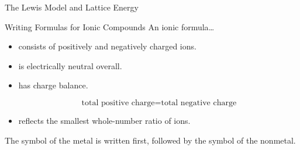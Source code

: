 \documentclass[notes=onlyslideswithnotes,notes=hide]{beamer}
\begin{document}
\begin{frame}{The Lewis Model and Lattice Energy}
%
%
%
%
%
%
%
%
\end{frame}

\begin{frame}{Writing Formulas for Ionic Compounds}
	An \alert{ionic formula}\ldots
	\begin{itemize}
		\item consists of positively and negatively charged ions.
		\item is electrically \alert{neutral} overall.
		\item has charge \alert{balance}.

			\begin{equation*}
				\text{total positive charge} = \text{total
				negative charge}
			\end{equation*}

		\item reflects the smallest whole-number ratio of ions.
	\end{itemize}

	\bigskip

	The symbol of the metal is written first, followed by the symbol of the
	nonmetal.
\end{frame}
\end{document}
